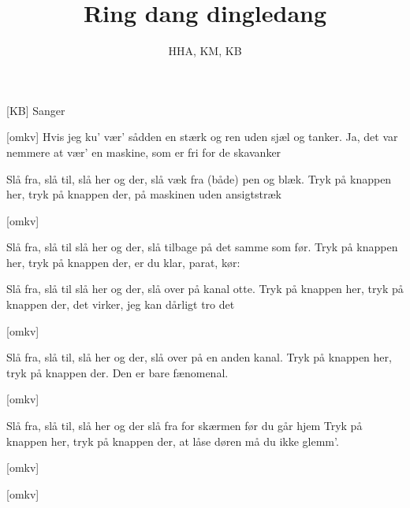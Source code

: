 \documentclass[a4paper,11pt]{article}
\title{Ring dang dingledang}
\author{HHA, KM, KB}
\begin{document}
\maketitle

\begin{roles}
[KB] Sanger

\end{roles}


\begin{song}
[omkv]%
Hvis jeg ku' vær' sådden en
stærk og ren
uden sjæl og tanker.
Ja, det var nemmere at vær'
en maskine, som er
fri for de skavanker

%
Slå fra, slå til,
slå her og der,
slå væk fra (både) pen og blæk.
Tryk på knappen her,
tryk på knappen der,
på maskinen uden ansigtstræk

[omkv]

%
Slå fra, slå til
slå her og der,
slå tilbage på det samme som før.
Tryk på knappen her,
tryk på knappen der,
er du klar, parat, kør:


%
Slå fra, slå til
slå her og der,
slå over på kanal otte.
Tryk på knappen her,
tryk på knappen der,
det virker, jeg kan dårligt tro det

[omkv]

%
Slå fra, slå til,
slå her og der,
slå over på en anden kanal.
Tryk på knappen her,
tryk på knappen der.
Den er bare fænomenal.

[omkv]

%
Slå fra, slå til,
slå her og der
slå fra for skærmen før du går hjem
Tryk på knappen her,
tryk på knappen der,
at låse døren må du ikke glemm'.

[omkv]

[omkv]
\end{song}
\end{document}
